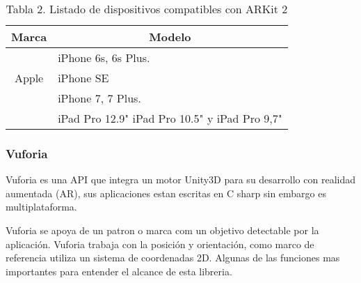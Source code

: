 \clearpage
\begin{table}[]
	\begin{tabular}{|c|l|}
		\hline
		\textbf{Marca}              & \multicolumn{1}{c|}{\textbf{Modelo}}               \\ \hline
		\multirow{3}{*}{Apple}       & iPhone 6s, 6s Plus.      \\ \cline{2-2} 
		& iPhone SE								                \\ \cline{2-2} 
		& iPhone 7,  7 Plus.     				                \\ \cline{2-2} 
		& iPad Pro 12.9" iPad Pro 10.5" y iPad Pro 9,7"             \\ \hline
	\end{tabular}
	\captionsetup{justification=centering}
	\caption*{Tabla 2. Listado de dispositivos compatibles con ARKit 2}
\end{table}
\noindent
\subsubsection{Vuforia}
Vuforia es una API que integra un motor Unity3D para su desarrollo con realidad aumentada (AR), sus aplicaciones estan escritas en C sharp sin embargo es multiplataforma.\par
Vuforia se apoya de un patron o marca com un objetivo detectable por la aplicación. Vuforia trabaja con la posición y orientación, como marco de referencia utiliza un sistema de coordenadas 2D. Algunas de las funciones mas importantes para entender el alcance de esta libreria. \cite{B12} 

